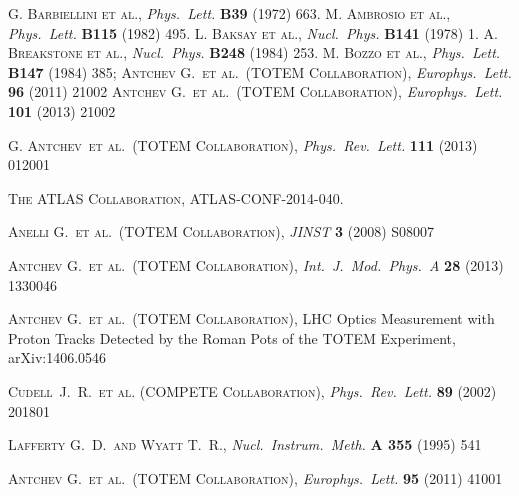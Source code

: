 \documentclass[pdftex,twocolumn,epjc3]{svjour3}
\def\etal{et al.}
\def\Name#1{\textsc{#1}, }
\def\REVIEW#1#2#3#4{{\it #1} {\bf #2} (#3) #4}
\begin{document}
\begin{thebibliography}{99}
%
 \Name{G. Barbiellini et al.} \REVIEW{Phys.~Lett.}{B39}{1972}{663}.
 \Name{M. Ambrosio et al.} \REVIEW{Phys.~Lett.}{B115}{1982}{495}.
 \Name{L. Baksay et al.} \REVIEW{Nucl.~Phys.}{B141}{1978}{1}.
 \Name{A. Breakstone et al.} \REVIEW{Nucl.~Phys.}{B248}{1984}{253}.
 \Name{M. Bozzo et al.} \REVIEW{Phys.~Lett.}{B147}{1984}{385}; 
	\Name{Antchev G.~\etal{}~(TOTEM Collaboration)}
	\REVIEW{Europhys.~Lett.}{96}{2011}{21002}
	\Name{Antchev G.~\etal{}~(TOTEM Collaboration)}
	\REVIEW{Europhys.~Lett.}{101}{2013}{21002}


	\Name{G. Antchev~\etal{}~(TOTEM Collaboration)}
	\REVIEW{Phys.~Rev.~Lett.}{111}{2013}{012001}

 \Name{The ATLAS Collaboration} ATLAS-CONF-2014-040.

	\Name{Anelli G.~\etal{}~(TOTEM Collaboration)}
	\REVIEW{JINST}{3}{2008}{S08007}


	\Name{Antchev G.~\etal{}~(TOTEM Collaboration)}
	\REVIEW{Int.~J.~Mod.~Phys.~A}{28}{2013}{1330046}

	\Name{Antchev G.~\etal{}~(TOTEM Collaboration)}
	LHC Optics Measurement with Proton Tracks Detected by the Roman Pots of the TOTEM Experiment, 
	arXiv:1406.0546

	\Name{Cudell~J.~R.~\etal{} (COMPETE Collaboration)}
	\REVIEW{Phys.\ Rev.\ Lett.}{89}{2002}{201801}

	\Name{Lafferty G.~D.~and Wyatt T.~R.}
	\REVIEW{Nucl.\ Instrum.\ Meth.}{A 355}{1995}{541}


\iffalse

	\Name{Antchev G.~\etal{}~(TOTEM Collaboration)}
	\REVIEW{Europhys.~Lett.}{95}{2011}{41001}



\end{thebibliography}
\end{document}
